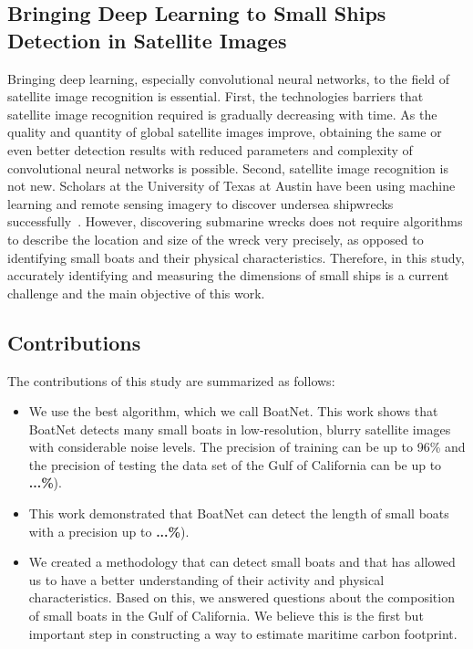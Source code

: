 \subsection{Bringing Deep Learning to Small Ships Detection in Satellite Images}
Bringing deep learning, especially convolutional neural networks, to the field of satellite image recognition is essential. First, the technologies barriers that satellite image recognition required is gradually decreasing with time. As the quality and quantity of global satellite images improve, obtaining the same or even better detection results with reduced parameters and complexity of convolutional neural networks is possible. Second, satellite image recognition is not new. Scholars at the University of Texas at Austin have been using machine learning and remote sensing imagery to discover undersea shipwrecks successfully~\cite{character2021archaeologic}. However, discovering submarine wrecks does not require algorithms to describe the location and size of the wreck very precisely, as opposed to identifying small boats and their physical characteristics. Therefore, in this study, accurately identifying and measuring the dimensions of small ships is a current challenge and the main objective of this work.


\subsection{Contributions}
The contributions of this study are summarized as follows:
\begin{itemize}
    \item We use the best algorithm, which we call BoatNet. This work shows that BoatNet detects many small boats in low-resolution, blurry satellite images with considerable noise levels. The precision of training can be up to 96\% and the precision of testing the data set of the Gulf of California can be up to \textbf{...\%}).

    \item This work demonstrated that BoatNet can detect the length of small boats with a precision up to \textbf{...\%}). 

    \item We created a methodology that can detect small boats and that has allowed us to have a better understanding of their activity and physical characteristics. Based on this, we answered questions about the composition of small boats in the Gulf of California. We believe this is the first but important step in constructing a way to estimate maritime carbon footprint.
\end{itemize}